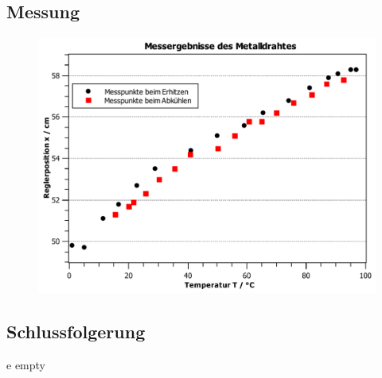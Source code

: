 \documentclass[11pt,a4paper,titlepage, ngerman]{article}
\begin{document}
		\subsection{Messung}
			
			
				\begin{figure}
				\centering
				\includegraphics[width=\textwidth]{MessungDraht.pdf}
				\caption{}
				\label{}
			\end{figure}
			
		\subsection{Schlussfolgerung}	
			
	
	\newpage	
	\begin{thebibliography}	
		e empty
	\end{thebibliography}	
			
\end{document}
